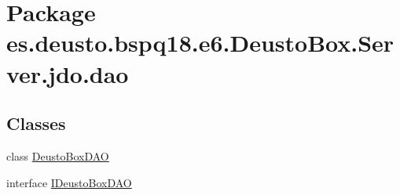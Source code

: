 \hypertarget{namespacees_1_1deusto_1_1bspq18_1_1e6_1_1_deusto_box_1_1_server_1_1jdo_1_1dao}{}\section{Package es.\+deusto.\+bspq18.\+e6.\+Deusto\+Box.\+Server.\+jdo.\+dao}
\label{namespacees_1_1deusto_1_1bspq18_1_1e6_1_1_deusto_box_1_1_server_1_1jdo_1_1dao}
\subsection*{Classes}
\begin{DoxyCompactItemize}
\item 
class \mbox{\hyperlink{classes_1_1deusto_1_1bspq18_1_1e6_1_1_deusto_box_1_1_server_1_1jdo_1_1dao_1_1_deusto_box_d_a_o}{Deusto\+Box\+D\+AO}}
\item 
interface \mbox{\hyperlink{interfacees_1_1deusto_1_1bspq18_1_1e6_1_1_deusto_box_1_1_server_1_1jdo_1_1dao_1_1_i_deusto_box_d_a_o}{I\+Deusto\+Box\+D\+AO}}
\end{DoxyCompactItemize}
